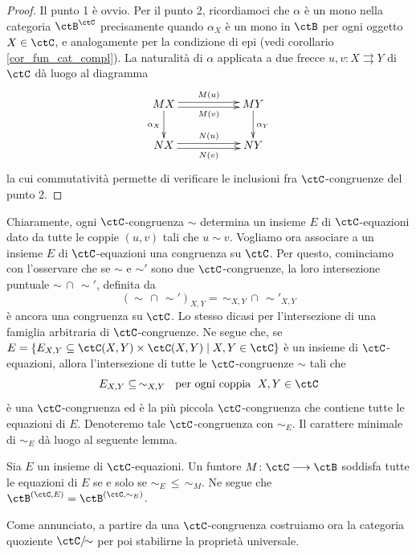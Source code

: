\begin{proof}
 Il punto 1 è ovvio. Per il punto 2, ricordiamoci che \(\alpha\) è un mono nella categoria \(\ctB^\ctC\) precisamente quando
 \(\alpha_X\) è un mono in \(\ctB\) per ogni oggetto \(X \in \ctC\), e analogamente per la condizione di epi (vedi corollario
 \ref{cor_fun_cat_compl}). La naturalità di \(\alpha\) applicata a due frecce \(u,v \colon X \rightrightarrows Y\) di \(\ctC\)
 dà luogo al diagramma
 \[\xymatrix{MX \ar@<-0.5ex>[rr]_-{M(v)} \ar@<0.5ex>[rr]^-{M(u)} \ar[d]_{\alpha_X} & & MY \ar[d]^{\alpha_Y} \\
  NX \ar@<-0.5ex>[rr]_-{N(v)} \ar@<0.5ex>[rr]^-{N(u)} & & NY }\]
 la cui commutatività permette di verificare le inclusioni fra \(\ctC\)-congruenze del punto 2.
\end{proof}


\begin{remark}\label{oss_inter_cong}
 Chiaramente, ogni \(\ctC\)-congruenza \(\sim\) determina un insieme \(E\) di \(\ctC\)-equazioni dato da tutte le coppie
 \((u,v)\) tali che \(u \sim v\). Vogliamo ora associare a un insieme \(E\) di \(\ctC\)-equazioni una congruenza su \(\ctC\).
 Per questo, cominciamo con l'osservare che se \(\sim\) e \(\sim'\) sono due \(\ctC\)-congruenze, la loro intersezione puntuale
 \(\sim \,\cap\, \sim'\), definita da
 \[(\sim \, \cap \, \sim' )_{X,Y} = \, \sim_{X,Y} \,\cap \, \sim'_{X,Y}\]
 è ancora una congruenza su \(\ctC\). Lo stesso dicasi per l'intersezione di una famiglia arbitraria di \(\ctC\)-congruenze.
 Ne segue che, se \(E = \{E_{X,Y} \subseteq \ctC(X,Y) \times \ctC(X,Y) \mid X,Y \in \ctC\} \) è un insieme di \(\ctC\)-equazioni,
 allora l'intersezione di tutte le \(\ctC\)-congruenze \(\sim\) tali che
 \[ E_{X,Y} \subseteq \, \sim_{X,Y} \;\mbox{ per ogni coppia }\; X,Y \in \ctC\]
 è una \(\ctC\)-congruenza ed è la più piccola \(\ctC\)-congruenza che contiene tutte le equazioni di \(E\). Denoteremo tale
 \(\ctC\)-congruenza con \(\sim_E\). Il carattere minimale di \(\sim_E\) dà luogo al seguente lemma.
\end{remark}

\begin{lemma}\label{lemma_equaz_cong}
 Sia \(E\) un insieme di \(\ctC\)-equazioni.
 Un funtore \(M \colon \ctC \fun \ctB\) soddisfa tutte le equazioni di \(E\) se e solo se \(\sim_E \,\leq\, \sim_M\).
 Ne segue che \(\ctB^{(\ctC,E)} = \ctB^{(\ctC,\sim_E)}\).
\end{lemma}

Come annunciato, a partire da una \(\ctC\)-congruenza costruiamo ora la categoria quoziente \(\ctC/{\!\sim}\) per poi
stabilirne la proprietà universale.

